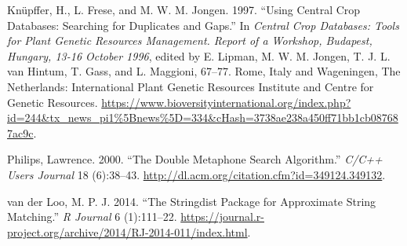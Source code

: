 \documentclass[]{article}
\begin{document}
\leavevmode\hypertarget{ref-kfj97}{}%
Knüpffer, H., L. Frese, and M. W. M. Jongen. 1997. ``Using Central Crop
Databases: Searching for Duplicates and Gaps.'' In \emph{Central Crop
Databases: Tools for Plant Genetic Resources Management. Report of a
Workshop, Budapest, Hungary, 13-16 October 1996}, edited by E. Lipman,
M. W. M. Jongen, T. J. L. van Hintum, T. Gass, and L. Maggioni, 67--77.
Rome, Italy and Wageningen, The Netherlands: International Plant Genetic
Resources Institute and Centre for Genetic Resources.
\url{https://www.bioversityinternational.org/index.php?id=244\&tx_news_pi1\%5Bnews\%5D=334\&cHash=3738ae238a450ff71bb1cb087687ac9c}.

\leavevmode\hypertarget{ref-p00}{}%
Philips, Lawrence. 2000. ``The Double Metaphone Search Algorithm.''
\emph{C/C++ Users Journal} 18 (6):38--43.
\url{http://dl.acm.org/citation.cfm?id=349124.349132}.

\leavevmode\hypertarget{ref-van2014stringdist}{}%
van der Loo, M. P. J. 2014. ``The Stringdist Package for Approximate
String Matching.'' \emph{R Journal} 6 (1):111--22.
\url{https://journal.r-project.org/archive/2014/RJ-2014-011/index.html}.
\end{document}

